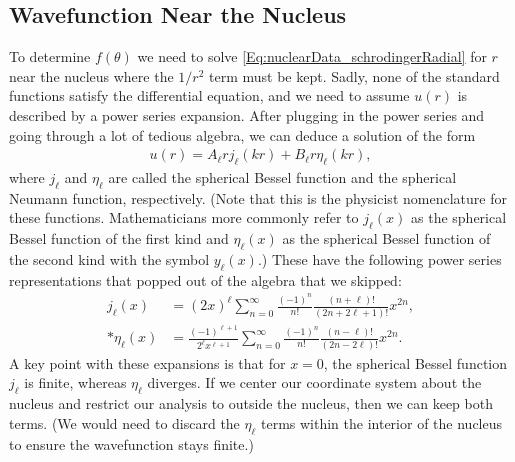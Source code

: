 \subsection{Wavefunction Near the Nucleus}

To determine $f(\theta)$ we need to solve \eqref{Eq:nuclearData_schrodingerRadial} for $r$ near the nucleus where the $1/r^2$ term must be kept. Sadly, none of the standard functions satisfy the differential equation, and we need to assume $u(r)$ is described by a power series expansion. After plugging in the power series and going through a lot of tedious algebra, we can deduce a solution of the form
\begin{align} \label{Eq:nuclearData_schrodingerTransformedRadialSolution}
  u(r) = A_\ell r j_\ell(kr) + B_\ell r \eta_\ell(kr) ,
\end{align}
where $j_\ell$ and $\eta_\ell$ are called the spherical Bessel function and the spherical Neumann function, respectively. (Note that this is the physicist nomenclature for these functions. Mathematicians more commonly refer to $j_\ell(x)$ as the spherical Bessel function of the first kind and $\eta_\ell(x)$ as the spherical Bessel function of the second kind with the symbol $y_\ell(x)$.) These have the following power series representations that popped out of the algebra that we skipped:
\begin{subequations} \label{Eq:nuclearData_sphericalBesselSeriesExpansions}
\begin{align} 
  j_\ell(x) 	&= ( 2 x )^\ell \sum_{n=0}^\infty \frac{(-1)^n}{n!} \frac{(n + \ell)!}{(2n + 2\ell + 1)!} x^{2n} , \\*
  \eta_\ell(x) 	&= \frac{ (-1)^{\ell+1}}{ 2^\ell x^{\ell+1} } \sum_{n=0}^\infty \frac{(-1)^n}{n!} \frac{(n - \ell)!}{(2n - 2\ell)!} x^{2n} .
\end{align}
\end{subequations}
A key point with these expansions is that for $x = 0$, the spherical Bessel function $j_\ell$ is finite, whereas $\eta_\ell$ diverges. If we center our coordinate system about the nucleus and restrict our analysis to outside the nucleus, then we can keep both terms. (We would need to discard the $\eta_\ell$ terms within the interior of the nucleus to ensure the wavefunction stays finite.) 

